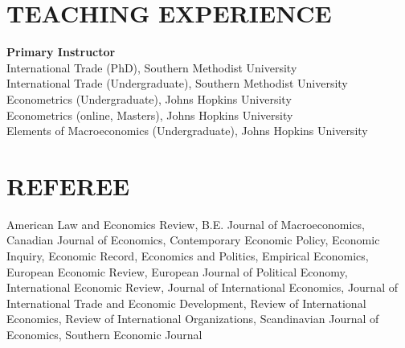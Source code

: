 \documentclass[11pt]{res}
\begin{document}
\begin{resume}
\section{TEACHING EXPERIENCE} \vspace{1.5mm}
{\bf Primary Instructor}\vspace{1.5mm}\\
International Trade (PhD), Southern Methodist University\vspace{1.5mm}\\


\phantom{.}\vspace{.05cm}
International Trade (Undergraduate), Southern Methodist University\vspace{1.5mm}\\
Econometrics (Undergraduate), Johns Hopkins University\vspace{1.5mm}\\
Econometrics (online, Masters), Johns Hopkins University\vspace{1.5mm}\\
Elements of Macroeconomics (Undergraduate), Johns Hopkins University\vspace{1.5mm}\\

\section{REFEREE} \vspace{1.5mm}
American Law and Economics Review, B.E. Journal of Macroeconomics, Canadian Journal of Economics, Contemporary Economic Policy, Economic Inquiry, 
Economic Record, Economics and Politics, Empirical Economics, European Economic Review, European Journal of Political Economy, International Economic Review, Journal of International Economics, Journal of International Trade and Economic Development, Review of International Economics, Review of International Organizations, Scandinavian Journal of Economics, Southern Economic Journal
\end{resume}
\end{document}

